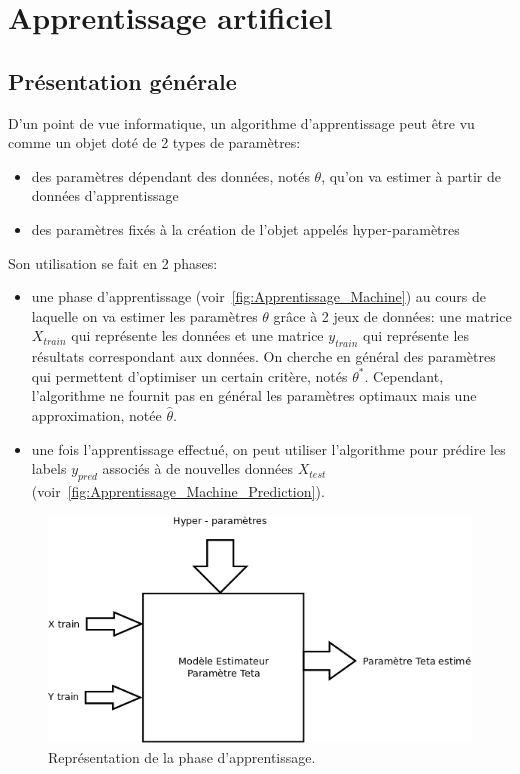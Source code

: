 \section{Apprentissage artificiel}

\subsection{Présentation générale}


D'un point de vue informatique, un algorithme d'apprentissage peut être vu comme un objet doté de 2 types de paramètres:
\begin{itemize}
 \item des paramètres dépendant des données, notés $\theta$, qu'on va estimer à partir de données d'apprentissage
 \item des paramètres fixés à la création de l'objet appelés hyper-paramètres
\end{itemize}
Son utilisation se fait en 2 phases:
\begin{itemize}
 \item une phase d'apprentissage (voir~\autoref{fig:Apprentissage_Machine}) au cours de laquelle on va estimer les paramètres $\theta$ grâce à 2 jeux de données:
 une matrice $X_{train}$ qui représente les données et une matrice $y_{train}$ qui représente les résultats correspondant aux données.
 On cherche en général des paramètres qui permettent d'optimiser un certain critère, notés $\theta^{*}$.
 Cependant, l'algorithme ne fournit pas en général les paramètres optimaux mais une approximation, notée $\hat{\theta}$.
 
 \item une fois l'apprentissage effectué, on peut utiliser l'algorithme pour prédire les labels $y_{pred}$ associés à de nouvelles données $X_{test}$ (voir~\autoref{fig:Apprentissage_Machine_Prediction}).
\end{itemize}

\begin{figure}[h]
  		\centering
  		\includegraphics[scale = 0.25]{images/Diagramme1}
  		\caption{Représentation de la phase d'apprentissage.}
  		\label{fig:Apprentissage_Machine}
\end{figure}
  	
